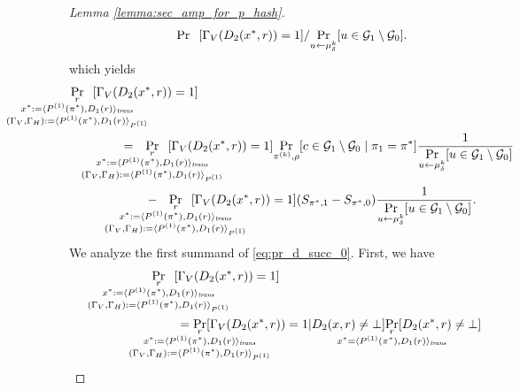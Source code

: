 \begin{proof}[Lemma \ref{lemma:sec_amp_for_p_hash}]
\begin{align*}
{\Pr}\mkern13mu [\Gamma_V(D_2(x^*, r)) = 1]
/ \underset{u \leftarrow \mu_{\delta}^k}{\Pr}[ u \in \mathcal{G}_1 \setminus\mathcal{G}_0].
\end{align*}
%
which yields
\begin{align}
\label{eq:pr_d_succ_0}
&\underset{
  \mathclap{
    \substack{r \\ x^* := \langle P^{(1)}(\pi^*), D_1(r) \rangle_{\mathit{trans}} \\ (\Gamma_V, \Gamma_H) := \langle P^{(1)}(\pi^*), D_1(r) \rangle_{P^{(1)}} }}}
{\Pr}\mkern13mu[\Gamma_V(D_2(x^*, r)) = 1] \notag\\
%
&\IndII = \mkern13mu
  \underset{
    \mathclap{
      \substack{r \\ x^* := \langle P^{(1)}(\pi^*), D_1 (r) \rangle_{\mathit{trans}} \\ (\Gamma_V, \Gamma_H) := \langle P^{(1)}(\pi^*), D_1 (r) \rangle_{P^{(1)}} }}}
  {\Pr}\mkern13mu[\Gamma_V(D_2(x^*, r)) = 1]
  \underset{\pi^{(k)},\rho}{\Pr}[c \in \cG_1 \setminus \cG_0 \mid \pi_1 = \pi^*]
\frac{1}{\underset{u \leftarrow \mu_{\delta}^k}{\Pr}[ u \in \cG_1 \setminus \cG_0]}\notag\\
%
&\IndIII - \mkern13mu
\underset{
  \mathclap{
  \substack{r \\ x^* := \langle P^{(1)}(\pi^*), D_1(r) \rangle_{\mathit{trans}} \\ (\Gamma_V, \Gamma_H) := \langle P^{(1)}(\pi^*), D_1(r) \rangle_{P^{(1)}} }}}
{\Pr}\mkern13mu[\Gamma_V(D_2(x^*, r)) = 1](S_{\pi^*,1} - S_{\pi^*,0})
\frac{1}{\underset{u \leftarrow \mu_{\delta}^k}{\Pr}[ u \in \cG_1 \setminus\cG_0]}.
\end{align}
We analyze the first summand of \eqref{eq:pr_d_succ_0}. First, we have
\begin{align}
  \label{eq:pr_gamma_v_0}
  \IndII &\underset{
    \mathclap{
      \substack{r \\
        x^* := \langle P^{(1)}(\pi^*), D_1 (r) \rangle_{\mathit{trans}} \\
        (\Gamma_V, \Gamma_H) := \langle P^{(1)}(\pi^*), D_1(r) \rangle_{P^{(1)}} }}}
  {\Pr}\mkern13mu[\Gamma_V(D_2(x^*, r)) = 1] \notag\\
  &\IndI = \underset{
    \mathclap{
      \substack{r \\
        x^* := \langle P^{(1)}(\pi^*), D_1 (r) \rangle_{\mathit{trans}} \\
        (\Gamma_V, \Gamma_H) := \langle P^{(1)}(\pi^*), D_1(r) \rangle_{P^{(1)}} }}}
  {\Pr}[\Gamma_V(D_2(x^*, r)) = 1 | D_2(x,r) \neq \bot]
  \underset{\mathclap{\substack{r \\ x^* = \langle P^{(1)}(\pi^*), D_1(r) \rangle_{\mathit{trans}}}}}{\Pr}[D_2(x^*,r) \neq \bot] \notag\\

\end{align}
\end{proof}
